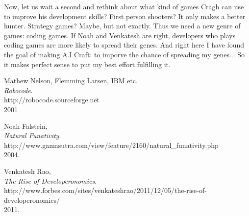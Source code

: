 \documentclass[12pt]{article}
\begin{document}
Now, let us wait a second and rethink about what kind of games Cragh can use to improve his development skills? First person shooters? It only makes a better hunter. Strategy games? Maybe, but not exactly. Thus we need a new genre of games: coding games. If Noah and Venkatesh are right, developers who plays coding games are more likely to spread their genes. And right here I have found the goal of making A.I Craft: to imporve the chance of spreading my genes... So it makes perfect sense to put my best effort fulfilling it.

\begin{thebibliography}{9}

	Mathew Nelson, Flemming Larsen, IBM etc.\\
	\emph{Robocode}.\\
	http://robocode.sourceforge.net\\
	2001

	Noah Falstein,\\
	\emph{Natural Funativity}.\\
	http://www.gamasutra.com/view/feature/2160/natural\_funativity.php\\
	2004.

	Venkatesh Rao,\\
	\emph{The Rise of Developeronomics}.\\
	http://www.forbes.com/sites/venkateshrao/2011/12/05/the-rise-of-developeronomics/\\
	2011.

\end{thebibliography}

	
\end{document}
